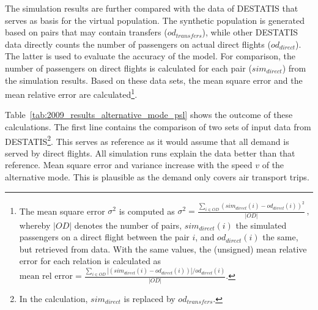 The simulation results are further compared with the data of DESTATIS that serves as basis for the virtual population.  
The synthetic population is generated based on  pairs that may contain transfers ($od_{transfers}$), 
while other DESTATIS data directly counts the number of passengers on actual direct flights ($od_{direct}$). %
The latter is used to evaluate the accuracy of the model.
For comparison, the number of passengers on direct flights is calculated for each  pair ($sim_{direct}$) from the simulation results.
Based on these data sets, the mean square error and the mean relative error are calculated\footnote{
The mean square error $\sigma^2$ is computed as
	$\sigma^2 = \frac{\sum_{i \in OD} (sim_{direct}(i) - od_{direct}(i))^2}{|OD|} \, , $
whereby $|OD|$ denotes the number of  pairs, $sim_{direct}(i)$ the simulated passengers on a direct flight between the  pair $i$, and $od_{direct}(i)$ the same, but retrieved from data.  
With the same values, the (unsigned) mean relative error for each  relation is calculated as
$
\mbox{mean rel error} = \frac{\sum_{i \in OD} |(sim_{direct}(i) - od_{direct}(i))|/ od_{direct}(i)}{|OD|}.
$
}. 

Table~\ref{tab:2009_results_alternative_mode_psl} shows the outcome of these calculations. 
The first line contains the comparison of two sets of input data from DESTATIS\footnote{In the calculation, $sim_{direct}$ is replaced by $od_{transfers}$.}. 
This serves as reference as it would assume that all demand is served by direct flights.
All simulation runs explain the data better than that reference.
Mean square error and variance increase with the speed $v$ of the alternative mode.  
This is plausible as the demand only covers air transport trips. 

